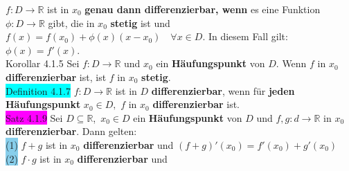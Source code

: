 \documentclass[landscape, 10pt]{article}
\newcommand{\R}{\mathbb{R}}
\begin{document}
\begin{multicols}{3}
                     \textcolor{NavyBlue}{$f:D\longrightarrow\R$} ist in 
                     $x_0$ \textbf{genau dann differenzierbar, wenn} es eine 
                     Funktion \textcolor{NavyBlue}{$\phi:D\longrightarrow\R$}
                     gibt, die in \textcolor{NavyBlue}{$x_0$} \textbf{stetig} ist 
                     und \textcolor{NavyBlue}{$f(x)=f(x_0)+\phi(x)(x-x_0)\quad\forall x\in D$}. 
                     In diesem Fall gilt: \textcolor{NavyBlue}{$\phi(x)=f'(x)$}.\\
              \colorbox{BurntOrange}{Korollar 4.1.5} 
                     Sei \textcolor{NavyBlue}{$f:D\longrightarrow\R$}
                     und \textcolor{NavyBlue}{$x_0$} ein \textbf{Häufungspunkt} von 
                     \textcolor{NavyBlue}{$D$}. 
                     Wenn \textcolor{NavyBlue}{$f$} in \textcolor{NavyBlue}{$x_0$} 
                     \textbf{differenzierbar} ist, ist \textcolor{NavyBlue}{$f$} in 
                     \textcolor{NavyBlue}{$x_0$} 
                     \textbf{stetig}.\\
              \colorbox{cyan}{Definition 4.1.7} 
                     \textcolor{NavyBlue}{$f:D\longrightarrow\R$} 
                     ist in \textcolor{NavyBlue}{$D$} \textbf{differenzierbar}, 
                     wenn für \textbf{jeden Häufungspunkt} $x_0\in D,$
                     \textcolor{NavyBlue}{$f$} in \textcolor{NavyBlue}{$x_0$} 
                     \textbf{differenzierbar} ist.\\
              \colorbox{magenta}{Satz 4.1.9} 
                     Sei \textcolor{NavyBlue}{$D\subseteq\R$},\,
                     \textcolor{NavyBlue}{$x_0\in D$} 
                     ein \textbf{Häufungspunkt} von \textcolor{NavyBlue}{$D$} 
                     und \textcolor{NavyBlue}{$f,g:d\longrightarrow\R$} in 
                     \textcolor{NavyBlue}{$x_0$} \textbf{differenzierbar}. 
                     Dann gelten:\\
                     \colorbox{SkyBlue}{(1)} \textcolor{NavyBlue}{$f+g$}
                            ist in \textcolor{NavyBlue}{$x_0$} 
                            \textbf{differenzierbar} und 
                            \textcolor{NavyBlue}{$(f+g)'(x_0)=f'(x_0)+g'(x_0)$}\\
                     \colorbox{SkyBlue}{(2)} 
                            \textcolor{NavyBlue}{$f\cdot g$} 
                            ist in \textcolor{NavyBlue}{$x_0$} 
                            \textbf{differenzierbar} und 
                            \textcolor{NavyBlue}{
}
\end{multicols}
\end{document}
